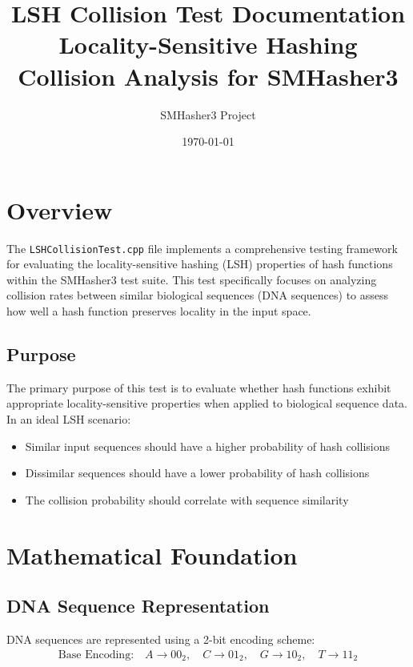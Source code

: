 \documentclass[11pt,a4paper]{article}
\title{\textbf{LSH Collision Test Documentation}\\
\large{Locality-Sensitive Hashing Collision Analysis for SMHasher3}}
\author{SMHasher3 Project}
\date{\today}
\begin{document}
\maketitle

\tableofcontents
\newpage

\section{Overview}

The \texttt{LSHCollisionTest.cpp} file implements a comprehensive testing framework for evaluating the locality-sensitive hashing (LSH) properties of hash functions within the SMHasher3 test suite. This test specifically focuses on analyzing collision rates between similar biological sequences (DNA sequences) to assess how well a hash function preserves locality in the input space.

\subsection{Purpose}

The primary purpose of this test is to evaluate whether hash functions exhibit appropriate locality-sensitive properties when applied to biological sequence data. In an ideal LSH scenario:
\begin{itemize}
    \item Similar input sequences should have a higher probability of hash collisions
    \item Dissimilar sequences should have a lower probability of hash collisions
    \item The collision probability should correlate with sequence similarity
\end{itemize}

\section{Mathematical Foundation}

\subsection{DNA Sequence Representation}

DNA sequences are represented using a 2-bit encoding scheme:
\begin{align}
\text{Base Encoding:} \quad A \rightarrow 00_2, \quad C \rightarrow 01_2, \quad G \rightarrow 10_2, \quad T \rightarrow 11_2
\end{align}
\end{document}
